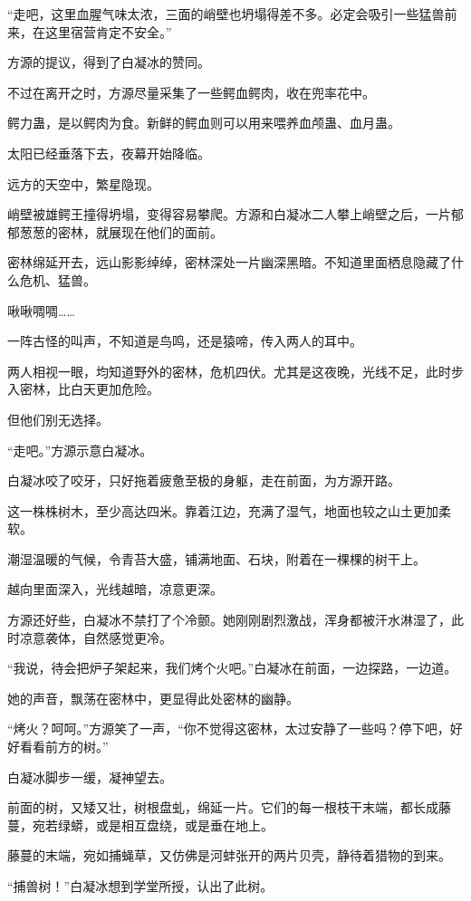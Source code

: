 \begin{this_body}
“走吧，这里血腥气味太浓，三面的峭壁也坍塌得差不多。必定会吸引一些猛兽前来，在这里宿营肯定不安全。”

方源的提议，得到了白凝冰的赞同。

不过在离开之时，方源尽量采集了一些鳄血鳄肉，收在兜率花中。

鳄力蛊，是以鳄肉为食。新鲜的鳄血则可以用来喂养血颅蛊、血月蛊。

太阳已经垂落下去，夜幕开始降临。

远方的天空中，繁星隐现。

峭壁被雄鳄王撞得坍塌，变得容易攀爬。方源和白凝冰二人攀上峭壁之后，一片郁郁葱葱的密林，就展现在他们的面前。

密林绵延开去，远山影影绰绰，密林深处一片幽深黑暗。不知道里面栖息隐藏了什么危机、猛兽。

啾啾啁啁……

一阵古怪的叫声，不知道是鸟鸣，还是猿啼，传入两人的耳中。

两人相视一眼，均知道野外的密林，危机四伏。尤其是这夜晚，光线不足，此时步入密林，比白天更加危险。

但他们别无选择。

“走吧。”方源示意白凝冰。

白凝冰咬了咬牙，只好拖着疲惫至极的身躯，走在前面，为方源开路。

这一株株树木，至少高达四米。靠着江边，充满了湿气，地面也较之山土更加柔软。

潮湿温暖的气候，令青苔大盛，铺满地面、石块，附着在一棵棵的树干上。

越向里面深入，光线越暗，凉意更深。

方源还好些，白凝冰不禁打了个冷颤。她刚刚剧烈激战，浑身都被汗水淋湿了，此时凉意袭体，自然感觉更冷。

“我说，待会把炉子架起来，我们烤个火吧。”白凝冰在前面，一边探路，一边道。

她的声音，飘荡在密林中，更显得此处密林的幽静。

“烤火？呵呵。”方源笑了一声，“你不觉得这密林，太过安静了一些吗？停下吧，好好看看前方的树。”

白凝冰脚步一缓，凝神望去。

前面的树，又矮又壮，树根盘虬，绵延一片。它们的每一根枝干末端，都长成藤蔓，宛若绿蟒，或是相互盘绕，或是垂在地上。

藤蔓的末端，宛如捕蝇草，又仿佛是河蚌张开的两片贝壳，静待着猎物的到来。

“捕兽树！”白凝冰想到学堂所授，认出了此树。


\end{this_body}
